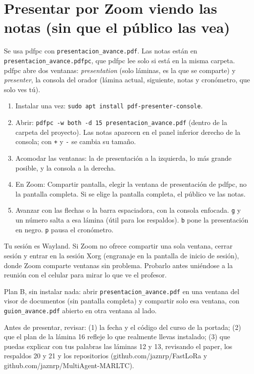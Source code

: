 \documentclass[10pt,letterpaper]{extarticle}
\begin{document}
\section*{Presentar por Zoom viendo las notas (sin que el público las vea)}
Se usa pdfpc con \texttt{presentacion\_avance.pdf}. Las notas están en \texttt{presentacion\_avance.pdfpc}, que pdfpc
lee solo si está en la misma carpeta. pdfpc abre dos ventanas: \emph{presentation} (solo láminas, es la que se comparte)
y \emph{presenter}, la consola del orador (lámina actual, siguiente, notas y cronómetro, que solo ves tú).
\begin{enumerate}[leftmargin=5mm]
\item Instalar una vez: \texttt{sudo apt install pdf-presenter-console}.
\item Abrir: \texttt{pdfpc -w both -d 15 presentacion\_avance.pdf} (dentro de la carpeta del proyecto). Las notas
aparecen en el panel inferior derecho de la consola; con \texttt{+} y \texttt{-} se cambia su tamaño.
\item Acomodar las ventanas: la de presentación a la izquierda, lo más grande posible, y la consola a la derecha.
\item En Zoom: Compartir pantalla, elegir la ventana de presentación de pdfpc, no la pantalla completa. Si se elige la
pantalla completa, el público ve las notas.
\item Avanzar con las flechas o la barra espaciadora, con la consola enfocada. \texttt{g} y un número salta a esa lámina
(útil para los respaldos). \texttt{b} pone la presentación en negro. \texttt{p} pausa el cronómetro.
\end{enumerate}
Tu sesión es Wayland. Si Zoom no ofrece compartir una sola ventana, cerrar sesión y entrar en la sesión Xorg (engranaje
en la pantalla de inicio de sesión), donde Zoom comparte ventanas sin problema. Probarlo antes uniéndose a la reunión con
el celular para mirar lo que ve el profesor.

Plan B, sin instalar nada: abrir \texttt{presentacion\_avance.pdf} en una ventana del visor de documentos (sin pantalla
completa) y compartir solo esa ventana, con \texttt{guion\_avance.pdf} abierto en otra ventana al lado.

\begin{alerta}
Antes de presentar, revisar: (1) la fecha y el código del curso de la portada; (2) que el plan de la lámina 16 refleje
lo que realmente llevas instalado; (3) que puedas explicar con tus palabras las láminas 12 y 13, revisando el paper,
los respaldos 20 y 21 y los repositorios (github.com/jaznrp/FastLoRa y github.com/jaznrp/MultiAgent-MARLTC).
\end{alerta}
\end{document}

